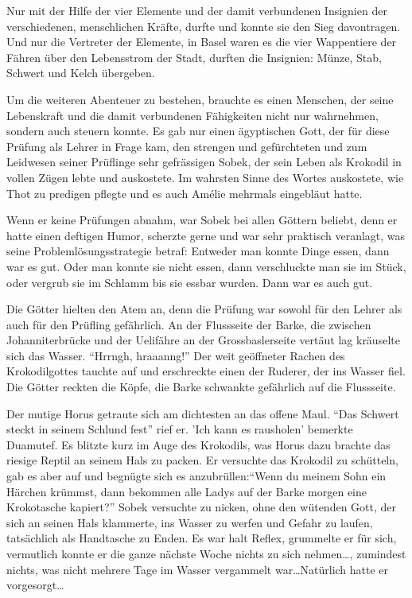 \documentclass[11pt,titlepage,a5paper]{book}
\begin{document}
Nur mit der Hilfe der vier Elemente und der damit verbundenen Insignien der verschiedenen, menschlichen Kräfte, durfte und konnte sie den Sieg davontragen. Und nur die Vertreter der Elemente, in Basel waren es die vier Wappentiere der Fähren über den Lebensstrom der Stadt, durften die Insignien: Münze, Stab, Schwert und Kelch übergeben.

Um die weiteren Abenteuer zu bestehen, brauchte es einen Menschen, der seine Lebenskraft und die damit verbundenen Fähigkeiten nicht nur wahrnehmen, sondern auch steuern konnte. Es gab nur einen ägyptischen Gott, der für diese Prüfung als Lehrer in Frage kam, den strengen und gefürchteten und zum Leidwesen seiner Prüflinge sehr gefrässigen Sobek, der sein Leben als Krokodil in vollen Zügen lebte und auskostete. Im wahrsten Sinne des Wortes auskostete, wie Thot zu predigen pflegte und es auch Amélie mehrmals eingebläut hatte.

Wenn er keine Prüfungen abnahm, war Sobek bei allen Göttern beliebt, denn er hatte einen deftigen Humor, scherzte gerne und war sehr praktisch veranlagt, was seine Problemlösungsstrategie betraf: Entweder man konnte Dinge essen, dann war es gut. Oder man konnte sie nicht essen, dann verschluckte man sie im Stück, oder vergrub sie im Schlamm bis sie essbar wurden. Dann war es auch gut.

Die Götter hielten den Atem an, denn die Prüfung war sowohl für den Lehrer als auch für den Prüfling gefährlich. An der Flussseite der Barke, die zwischen Johanniterbrücke und der Uelifähre an der Grossbaslerseite vertäut lag kräuselte sich das Wasser. "`Hrrngh, hraaanng!"' Der weit geöffneter Rachen des Krokodilgottes tauchte auf und erschreckte einen der Ruderer, der ins Wasser fiel. Die Götter reckten die Köpfe, die Barke schwankte gefährlich auf die Flussseite. 

Der mutige Horus getraute sich am dichtesten an das offene Maul. "`Das Schwert steckt in seinem Schlund fest"' rief er. 'Ich kann es rausholen' bemerkte Duamutef. Es blitzte kurz im Auge des Krokodils, was Horus dazu brachte das riesige Reptil an seinem Hals zu packen. Er versuchte das Krokodil zu schütteln, gab es aber auf und begnügte sich es anzubrüllen:"`Wenn du meinem Sohn ein Härchen krümmst, dann bekommen alle Ladys auf der Barke morgen eine Krokotasche kapiert?"' Sobek versuchte zu nicken, ohne den wütenden Gott, der sich an seinen Hals klammerte, ins Wasser zu werfen und Gefahr zu laufen, tatsächlich als Handtasche zu Enden. Es war halt Reflex, grummelte er für sich, vermutlich konnte er die ganze nächste Woche nichts zu sich nehmen\dots, zumindest nichts, was nicht mehrere Tage im Wasser vergammelt war\dots Natürlich hatte er vorgesorgt\dots
\end{document}
